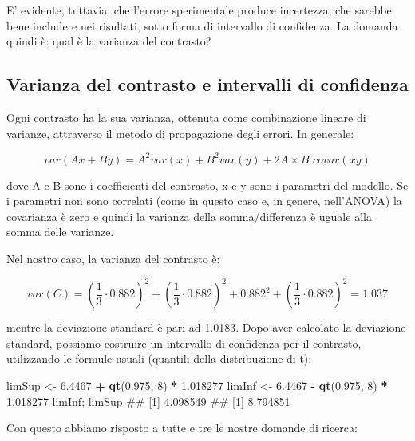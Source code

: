 \documentclass[a4paper,12pt,oneside]{book}
\newenvironment{Shaded}{\begin{snugshade}}{\end{snugshade}}
\newcommand{\KeywordTok}[1]{\textcolor[rgb]{0.13,0.29,0.53}{\textbf{#1}}}
\newcommand{\DecValTok}[1]{\textcolor[rgb]{0.00,0.00,0.81}{#1}}
\newcommand{\FloatTok}[1]{\textcolor[rgb]{0.00,0.00,0.81}{#1}}
\newcommand{\StringTok}[1]{\textcolor[rgb]{0.31,0.60,0.02}{#1}}
\newcommand{\OperatorTok}[1]{\textcolor[rgb]{0.81,0.36,0.00}{\textbf{#1}}}
\newcommand{\NormalTok}[1]{#1}
\theoremstyle{definition}
\theoremstyle{definition}
\theoremstyle{definition}
\theoremstyle{remark}
\begin{document}
E' evidente, tuttavia, che l'errore sperimentale produce incertezza, che
sarebbe bene includere nei risultati, sotto forma di intervallo di
confidenza. La domanda quindi è: qual è la varianza del contrasto?

\subsection{Varianza del contrasto e intervalli di
confidenza}\label{varianza-del-contrasto-e-intervalli-di-confidenza}

Ogni contrasto ha la sua varianza, ottenuta come combinazione lineare di
varianze, attraverso il metodo di propagazione degli errori. In
generale:

\[var(A x + B y) = A^{2} var(x) + B^2 var(y) + 2 A \times B \,\, covar (x y)\]

dove A e B sono i coefficienti del contrasto, x e y sono i parametri del
modello. Se i parametri non sono correlati (come in questo caso e, in
genere, nell'ANOVA) la covarianza è zero e quindi la varianza della
somma/differenza è uguale alla somma delle varianze.

Nel nostro caso, la varianza del contrasto è:

\[var(C) = \left( \frac{1}{3} \cdot 0.882 \right)^2 +  \left( \frac{1}{3} \cdot 0.882 \right)^2 + 0.882^2 +  \left( \frac{1}{3} \cdot 0.882 \right)^2 = 1.037\]

mentre la deviazione standard è pari ad 1.0183. Dopo aver calcolato la
deviazione standard, possiamo costruire un intervallo di confidenza per
il contrasto, utilizzando le formule usuali (quantili della
distribuzione di t):

\begin{Shaded}
\begin{Highlighting}[]
\NormalTok{limSup <-}\StringTok{ }\FloatTok{6.4467} \OperatorTok{+}\StringTok{ }\KeywordTok{qt}\NormalTok{(}\FloatTok{0.975}\NormalTok{, }\DecValTok{8}\NormalTok{) }\OperatorTok{*}\StringTok{ }\FloatTok{1.018277}
\NormalTok{limInf <-}\StringTok{ }\FloatTok{6.4467} \OperatorTok{-}\StringTok{ }\KeywordTok{qt}\NormalTok{(}\FloatTok{0.975}\NormalTok{, }\DecValTok{8}\NormalTok{) }\OperatorTok{*}\StringTok{ }\FloatTok{1.018277}
\NormalTok{limInf; limSup}
\NormalTok{## [1] 4.098549}
\NormalTok{## [1] 8.794851}
\end{Highlighting}
\end{Shaded}

Con questo abbiamo risposto a tutte e tre le nostre domande di ricerca:
\end{document}
